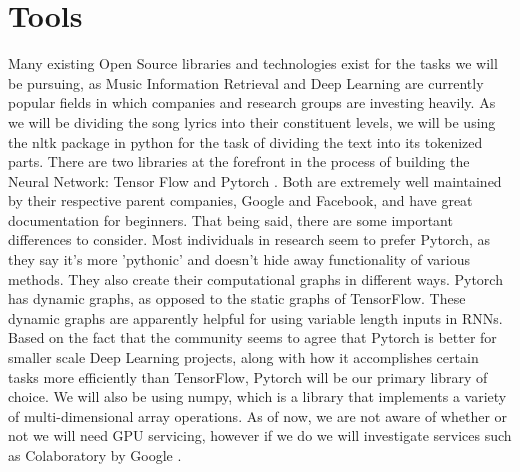 \documentclass[11pt,a4paper]{article}
\begin{document}
\section{Tools}
Many existing Open Source libraries and technologies exist for the tasks we will be pursuing, as Music Information Retrieval and Deep Learning are currently popular fields in which companies and research groups are investing heavily.
As we will be dividing the song lyrics into their constituent levels, we will be using the nltk package in python \cite{Loper02nltk:the} for the task of dividing the text into its tokenized parts. 
There are two libraries at the forefront in the process of building the Neural Network: Tensor Flow \cite{tensorflow2015-whitepaper} and Pytorch \cite{paszke2017automatic}. Both are extremely well maintained by their respective parent companies, Google and Facebook, and have great documentation for beginners. 
That being said, there are some important differences to consider. 
Most individuals in research seem to prefer Pytorch, as they say it's more 'pythonic' and doesn't hide away functionality of various methods. 
They also create their computational graphs in different ways. Pytorch has dynamic graphs, as opposed to the static graphs of TensorFlow. These dynamic graphs are apparently helpful for using variable length inputs in RNNs.
Based on the fact that the community seems to agree that Pytorch is better for smaller scale Deep Learning projects, along with how it accomplishes certain tasks more efficiently than TensorFlow, Pytorch will be our primary library of choice. 
We will also be using numpy, which is a library that implements a variety of multi-dimensional array operations. As of now, we are not aware of whether or not we will need GPU servicing, however if we do we will investigate services such as Colaboratory by Google \cite{colaboratory}.



\footnotesize

\end{document}

